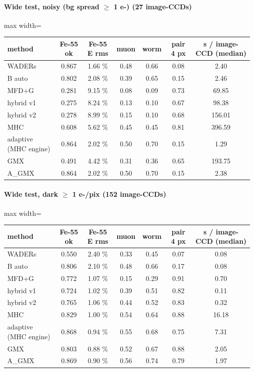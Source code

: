 \paragraph{Wide test, noisy (bg spread $\ge$ 1 e-) (27 image-CCDs)}
\begin{table}[H]\centering\footnotesize
\begin{adjustbox}{max width=\linewidth}
\begin{tabular}{lcccccc}
\toprule
method & Fe-55 ok & Fe-55 E rms & muon & worm & pair 4 px & s / image-CCD (median) \\
\midrule
WADERs & 0.867 & 1.66 \% & 0.48 & 0.66 & 0.08 & 2.40 \\
B auto & 0.802 & 2.08 \% & 0.39 & 0.65 & 0.15 & 2.46 \\
MFD+G & 0.281 & 9.15 \% & 0.08 & 0.09 & 0.73 & 69.85 \\
hybrid v1 & 0.275 & 8.24 \% & 0.13 & 0.10 & 0.67 & 98.38 \\
hybrid v2 & 0.278 & 8.99 \% & 0.15 & 0.10 & 0.68 & 156.01 \\
MHC & 0.608 & 5.62 \% & 0.45 & 0.45 & 0.81 & 396.59 \\
adaptive (MHC engine) & 0.864 & 2.02 \% & 0.50 & 0.70 & 0.15 & 1.29 \\
GMX & 0.491 & 4.42 \% & 0.31 & 0.36 & 0.65 & 193.75 \\
A\_GMX & 0.864 & 2.02 \% & 0.50 & 0.70 & 0.15 & 2.38 \\
\bottomrule
\end{tabular}
\end{adjustbox}
\end{table}

\paragraph{Wide test, dark $\ge$ 1 e-/pix (152 image-CCDs)}
\begin{table}[H]\centering\footnotesize
\begin{adjustbox}{max width=\linewidth}
\begin{tabular}{lcccccc}
\toprule
method & Fe-55 ok & Fe-55 E rms & muon & worm & pair 4 px & s / image-CCD (median) \\
\midrule
WADERs & 0.550 & 2.40 \% & 0.33 & 0.45 & 0.07 & 0.08 \\
B auto & 0.806 & 2.10 \% & 0.48 & 0.66 & 0.17 & 0.08 \\
MFD+G & 0.772 & 1.07 \% & 0.15 & 0.29 & 0.91 & 0.70 \\
hybrid v1 & 0.724 & 1.02 \% & 0.39 & 0.51 & 0.82 & 0.11 \\
hybrid v2 & 0.765 & 1.06 \% & 0.44 & 0.52 & 0.83 & 0.32 \\
MHC & 0.829 & 1.00 \% & 0.54 & 0.64 & 0.88 & 16.18 \\
adaptive (MHC engine) & 0.868 & 0.94 \% & 0.55 & 0.68 & 0.75 & 7.31 \\
GMX & 0.803 & 0.88 \% & 0.52 & 0.67 & 0.88 & 2.05 \\
A\_GMX & 0.869 & 0.90 \% & 0.56 & 0.74 & 0.79 & 1.97 \\
\bottomrule
\end{tabular}
\end{adjustbox}
\end{table}

